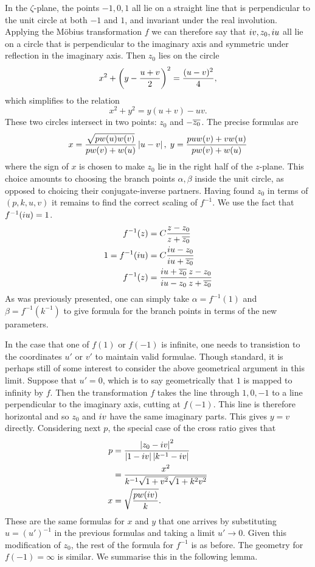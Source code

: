 In the $ζ$-plane, the points $-1,0,1$ all lie on a straight line that is perpendicular to the unit circle at both $-1$ and $1$, and invariant under the real involution. Applying the M\"obius transformation $f$ we can therefore say that $i v, z_0, i u$ all lie on a circle that is perpendicular to the imaginary axis and symmetric under reflection in the imaginary axis. Then $z_0$ lies on the circle
\[
x^2 + \left( y - \frac{u+v}{2} \right)^2 = \frac{(u-v)^2}{4},
\]
which simplifies to the relation
\[
x^2 + y^2 = y(u+v) - uv.
\]
These two circles intersect in two points: $z_0$ and $-\overline{z_0}$. The precise formulas are
\[
x = \frac{\sqrt{pw(u)w(v)}}{pw(v) + w(u)} \left|u-v\right|,\; y = \frac{puw(v) + vw(u)}{pw(v) + w(u)}
\]
where the sign of $x$ is chosen to make $z_0$ lie in the right half of the $z$-plane. This choice amounts to choosing the branch points $α,β$ inside the unit circle, as opposed to choicing their conjugate-inverse partners. Having found $z_0$ in terms of $(p,k,u,v)$ it remains to find the correct scaling of $f^{-1}$. We use the fact that $f^{-1}(i u) = 1$.
\begin{align*}
f^{-1}(z) &= C \frac{z-z_0}{z + \overline{z_0}} \\
1 = f^{-1}(i u) &= C \frac{i u - z_0}{i u + \overline{z_0}} \\
f^{-1}(z) &=  \frac{i u + \overline{z_0}}{i u - z_0} \frac{z-z_0}{z + \overline{z_0}}
\end{align*}
As was previously presented, one can simply take $α = f^{-1}(1)$ and $β = f^{-1}(k^{-1})$ to give formula for the branch points in terms of the new parameters.

In the case that one of $f(1)$ or $f(-1)$ is infinite, one needs to transistion to the coordinates $u'$ or $v'$ to maintain valid formulae. Though standard, it is perhaps still of some interest to consider the above geometrical argument in this limit. Suppose that $u' = 0$, which is to say geometrically that $1$ is mapped to infinity by $f$. Then the transformation $f$ takes the line through $1,0,-1$ to a line perpendicular to the imaginary axis, cutting at $f(-1)$. This line is therefore horizontal and so $z_0$ and $i v$ have the same imaginary parts. This gives $y=v$ directly. Considering next $p$, the special case of the cross ratio gives that
\begin{align}
p
&= \frac{\left|z_0 -i v\right|^2}{\left|1-i v\right|\left|k^{-1}-i v\right|} \\
&= \frac{x^2}{k^{-1}\sqrt{1+v^2}\sqrt{1+k^2 v^2}} \\
x &= \sqrt{\frac{p w(i v)}{k}}.
\end{align}
These are the same formulas for $x$ and $y$ that one arrives by substituting $u = (u')^{-1}$ in the previous formulas and taking a limit $u' \to 0$. Given this modification of $z_0$, the rest of the formula for $f^{-1}$ is as before. The geometry for $f(-1) = \infty$ is similar. We summarise this in the following lemma.

